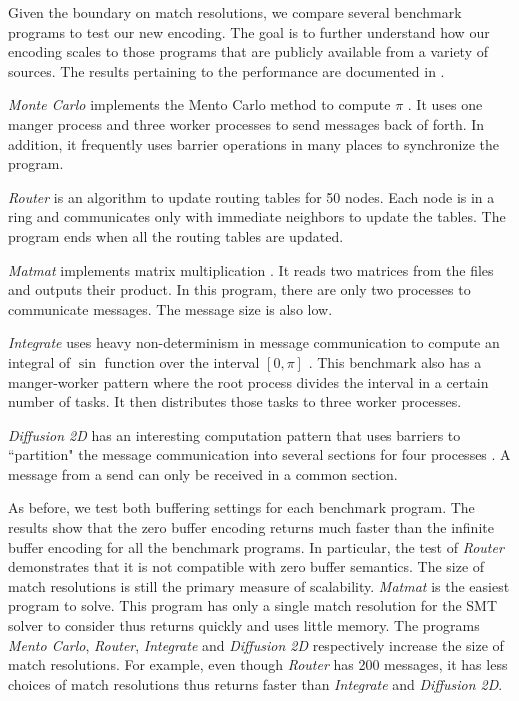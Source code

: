 Given the boundary on match resolutions, we compare several benchmark programs to test our new encoding. The goal is to further understand how our encoding scales to those programs that are publicly available from a variety of sources. The results pertaining to the performance are documented in . 

\begin{compactitem}

\item \textit{Monte Carlo} implements the Mento Carlo method to compute $\pi$ \cite{benchmark:mentoCarlo}. It uses one manger process and three worker processes to send messages back of forth. In addition, it frequently uses barrier operations in many places to synchronize the program. 
\item \textit{Router} is an algorithm to update routing tables for 50 nodes. Each node is in a ring and communicates only with immediate neighbors to update the tables. The program ends when all the routing tables are updated. 
\item \textit{Matmat} implements matrix multiplication \cite{benchmark:fevs}. It reads two matrices from the files and outputs their product. In this program, there are only two processes to communicate messages. The message size is also low.
\item \textit{Integrate} uses heavy non-determinism in message communication to compute an integral of $\sin$ function over the interval $[0, \pi]$ \cite{benchmark:fevs}. This benchmark also has a manger-worker pattern where the root process divides the interval in a certain number of tasks. It then distributes those tasks to three worker processes. %
\item \textit{Diffusion 2D} has an interesting computation pattern that uses barriers to ``partition" the message communication into several sections for four processes \cite{benchmark:fevs}. A message from a send can only be received in a common section. 
\end{compactitem}

As before, we test both buffering settings for each benchmark program. The results show that the zero buffer encoding returns much faster than the infinite buffer encoding for all the benchmark programs. In particular, the test of \textit{Router} demonstrates that it is not compatible with zero buffer semantics. The size of match resolutions is still the primary measure of scalability. \textit{Matmat} is the easiest program to solve. This program has only a single match resolution for the SMT solver to consider thus returns quickly and uses little memory. The programs \textit{Mento Carlo}, \textit{Router}, \textit{Integrate} and \textit{Diffusion 2D} respectively increase the size of match resolutions. For example, even though \textit{Router} has 200 messages, it has less choices of match resolutions thus returns faster than \textit{Integrate} and \textit{Diffusion 2D}. 

